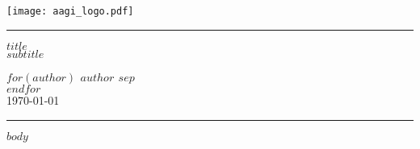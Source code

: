 \documentclass{scrartcl}
\begin{document}
	
	\begin{titlepage}
		
		\thispagestyle{Title_page}
		
		\vspace*{-2cm}
		
		\begin{center}
			\texttt{[image: aagi\_logo.pdf]}
		\end{center}
		
		\vfill
		
		\rule{\textwidth}{0.5pt}
		
		\begin{FlushRight}
			
			\huge
			\textcolor{aagiteal}{\textbf{$title$}}\\[6mm]
			
			\large
			{\textbf{$subtitle$}}\\[5mm]
			\vspace{2mm}
			
			\normalsize
			\textbf{$for(author)$
					$author$
					$sep$ \\[8mm]
					$endfor$}\\[8mm]

    		\today
  \end{FlushRight}

  \rule{\textwidth}{0.5pt}

  \vfill
		
	\end{titlepage}
	
	\newpage
	
	$body$
	
\end{document}
